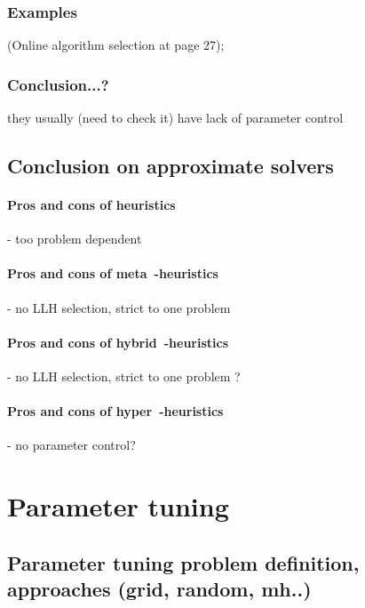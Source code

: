 \subsubsection{Examples}%
\cite{surv:drake2019recent} (Online algorithm selection at page 27); \cite{surv:kerschke2019automated}
\subsubsection{Conclusion...?} they usually (need to check it) have lack of parameter control

\subsection{Conclusion on approximate solvers}
\paragraph{Pros and cons of heuristics} - too problem dependent
\paragraph{Pros and cons of meta~-heuristics} - no LLH selection, strict to one problem
\paragraph{Pros and cons of hybrid~-heuristics} - no LLH selection, strict to one problem ? 
\paragraph{Pros and cons of hyper~-heuristics} - no parameter control?


\section{Parameter tuning}\label{bg: parameter tuning}

\subsection{Parameter tuning problem definition, approaches (grid, random, mh..)}

